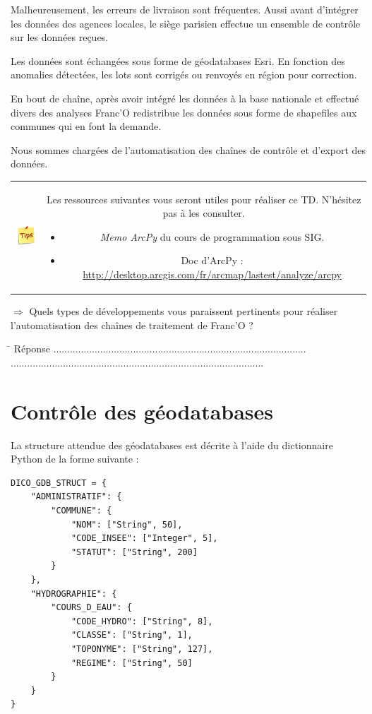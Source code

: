 \documentclass[11pt]{article}
\newcommand{\action}{$\Rightarrow$ }
\newcommand{\reponse}{
	\begin{tabbing}
	\hspace{2cm}\=\kill
	Réponse \> ............................................................................................ \\
 	\> ............................................................................................
	\end{tabbing}
}
\newenvironment{note}{%
	\begin{tabular}[t t]{c c}
		\includegraphics{img/tips.png}
		 &
		\begin{minipage}[c]{0.9\linewidth}
			\begin{sffamily}
}{%
			\end{sffamily}
		\end{minipage}
	\end{tabular}
}
\begin{document}
Malheureusement, les erreurs de livraison sont fréquentes. Aussi avant d'intégrer les données des agences locales, le siège parisien effectue un ensemble de contrôle sur les données reçues.

Les données sont échangées sous forme de géodatabases Esri. En fonction des anomalies détectées, les lots sont corrigés ou renvoyés en région pour correction.

En bout de chaîne, après avoir intégré les données à la base nationale et effectué divers des analyses Franc'O redistribue les données sous forme de shapefiles aux communes qui en font la demande.

Nous sommes chargées de l'automatisation des chaînes de contrôle et d'export des données.

\begin{note}
Les ressources suivantes vous seront utiles pour réaliser ce TD. N'hésitez pas à les consulter.
\begin{itemize}
	\item \textit{Memo ArcPy} du cours de programmation sous SIG.
	\item Doc d'ArcPy : \url{http://desktop.arcgis.com/fr/arcmap/lastest/analyze/arcpy}
\end{itemize}
\end{note}

\action Quels types de développements vous paraissent pertinents pour réaliser l'automatisation des chaînes de traitement de Franc'O ?

\reponse


\section{Contrôle des géodatabases}

La structure attendue des géodatabases est décrite à l'aide du dictionnaire Python de la forme suivante :
\begin{lstlisting}
DICO_GDB_STRUCT = {
    "ADMINISTRATIF": {
        "COMMUNE": {
            "NOM": ["String", 50],
            "CODE_INSEE": ["Integer", 5],
            "STATUT": ["String", 200]
        }
    },
    "HYDROGRAPHIE": {
        "COURS_D_EAU": {
            "CODE_HYDRO": ["String", 8],
            "CLASSE": ["String", 1],
            "TOPONYME": ["String", 127],
            "REGIME": ["String", 50]
        }
    }
}
\end{lstlisting}
\end{document}
